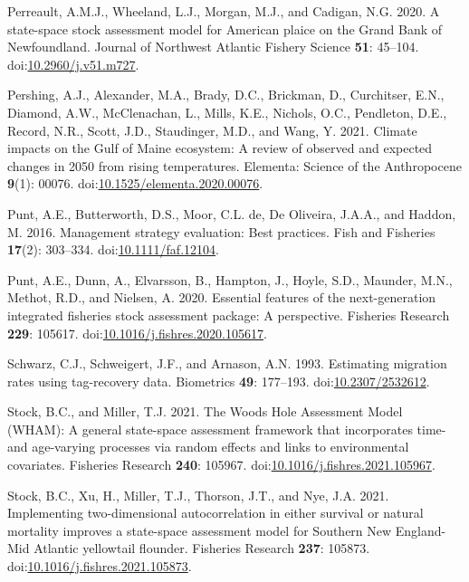 \documentclass[
]{article}
\newlength{\cslhangindent}
\newlength{\cslentryspacingunit} %
\newenvironment{CSLReferences}[2] %
 {%
  \setlength{\parindent}{0pt}
  \ifodd #1
  \let\oldpar\par
  \def\par{\hangindent=\cslhangindent\oldpar}
  \fi
  \setlength{\parskip}{#2\cslentryspacingunit}
 }%
 {}
\begin{document}
\begin{CSLReferences}{1}{0}
\leavevmode{}%
Perreault, A.M.J., Wheeland, L.J., Morgan, M.J., and Cadigan, N.G. 2020. A state-space stock assessment model for {American} plaice on the {Grand} {Bank} of {Newfoundland}. Journal of Northwest Atlantic Fishery Science \textbf{51}: 45--104. doi:\href{https://doi.org/10.2960/j.v51.m727}{10.2960/j.v51.m727}.

\leavevmode{}%
Pershing, A.J., Alexander, M.A., Brady, D.C., Brickman, D., Curchitser, E.N., Diamond, A.W., McClenachan, L., Mills, K.E., Nichols, O.C., Pendleton, D.E., Record, N.R., Scott, J.D., Staudinger, M.D., and Wang, Y. 2021. Climate impacts on the {G}ulf of {M}aine ecosystem: A review of observed and expected changes in 2050 from rising temperatures. Elementa: Science of the Anthropocene \textbf{9}(1): 00076. doi:\href{https://doi.org/10.1525/elementa.2020.00076}{10.1525/elementa.2020.00076}.

\leavevmode{}%
Punt, A.E., Butterworth, D.S., Moor, C.L. de, De Oliveira, J.A.A., and Haddon, M. 2016. Management strategy evaluation: Best practices. Fish and Fisheries \textbf{17}(2): 303--334. doi:\href{https://doi.org/10.1111/faf.12104}{10.1111/faf.12104}.

\leavevmode{}%
Punt, A.E., Dunn, A., Elvarsson, B., Hampton, J., Hoyle, S.D., Maunder, M.N., Methot, R.D., and Nielsen, A. 2020. Essential features of the next-generation integrated fisheries stock assessment package: A perspective. Fisheries Research \textbf{229}: 105617. doi:\href{https://doi.org/10.1016/j.fishres.2020.105617}{10.1016/j.fishres.2020.105617}.

\leavevmode{}%
Schwarz, C.J., Schweigert, J.F., and Arnason, A.N. 1993. Estimating migration rates using tag-recovery data. Biometrics \textbf{49}: 177--193. doi:\href{https://doi.org/10.2307/2532612}{10.2307/2532612}.

\leavevmode{}%
Stock, B.C., and Miller, T.J. 2021. The {Woods Hole Assessment Model} ({WHAM}): A general state-space assessment framework that incorporates time- and age-varying processes via random effects and links to environmental covariates. Fisheries Research \textbf{240}: 105967. doi:\href{https://doi.org/10.1016/j.fishres.2021.105967}{10.1016/j.fishres.2021.105967}.

\leavevmode{}%
Stock, B.C., Xu, H., Miller, T.J., Thorson, J.T., and Nye, J.A. 2021. Implementing two-dimensional autocorrelation in either survival or natural mortality improves a state-space assessment model for {Southern New England}-{Mid Atlantic} yellowtail flounder. Fisheries Research \textbf{237}: 105873. doi:\href{https://doi.org/10.1016/j.fishres.2021.105873}{10.1016/j.fishres.2021.105873}.


\end{CSLReferences}
\end{document}
